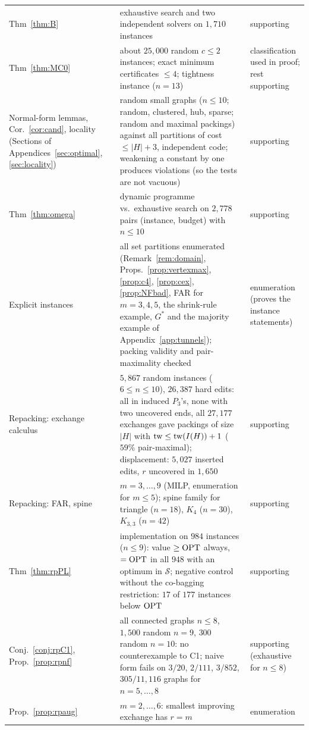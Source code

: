 {\begin{longtable}{@{}>{\raggedright\arraybackslash}p{}>{\raggedright\arraybackslash}p{}>{\raggedright\arraybackslash}p{}@{}}
Thm~\ref{thm:B} & exhaustive search and two independent solvers on $1{,}710$ instances & supporting\\
Thm~\ref{thm:MC0} & about $25{,}000$ random $c\le2$ instances; exact minimum certificates $\le4$; tightness instance ($n=13$) & classification used in proof; rest supporting\\
Normal-form lemmas, Cor.~\ref{cor:cand}, locality (Sections of Appendices~\ref{sec:optimal}, \ref{sec:locality}) & random small graphs ($n\le10$; random, clustered, hub, sparse; random and maximal packings) against all partitions of cost $\le|H|+3$, independent code; weakening a constant by one produces violations (so the tests are not vacuous) & supporting\\
Thm~\ref{thm:omega} & dynamic programme vs.\ exhaustive search on $2{,}778$ pairs (instance, budget) with $n\le10$ & supporting\\
Explicit instances & all set partitions enumerated (Remark~\ref{rem:domain}, Props.~\ref{prop:vertexmax}, \ref{prop:c4}, \ref{prop:cex}, \ref{prop:NFbad}, FAR for $m=3,4,5$, the shrink-rule example, $G^*$ and the majority example of Appendix~\ref{app:tunnels}); packing validity and pair-maximality checked & enumeration (proves the instance statements)\\
Repacking: exchange calculus & $5{,}867$ random instances ($6\le n\le10$), $26{,}387$ hard edits: all in induced $P_3$'s, none with two uncovered ends, all $27{,}177$ exchanges gave packings of size $|H|$ with $\mathrm{tw}\le\mathrm{tw}(I(H))+1$ ($59\%$ pair-maximal); displacement: $5{,}027$ inserted edits, $r$ uncovered in $1{,}650$ & supporting\\
Repacking: FAR, spine & $m=3,\dots,9$ (MILP, enumeration for $m\le5$); spine family for triangle ($n=18$), $K_4$ ($n=30$), $K_{3,3}$ ($n=42$) & supporting\\
Thm~\ref{thm:rpPL} & implementation on $984$ instances ($n\le9$): value $\ge\mathrm{OPT}$ always, $=\mathrm{OPT}$ in all $948$ with an optimum in $\mathcal S$; negative control without the co-bagging restriction: $17$ of $177$ instances below $\mathrm{OPT}$ & supporting\\
Conj.~\ref{conj:rpC1}, Prop.~\ref{prop:rpnf} & all connected graphs $n\le8$, $1{,}500$ random $n=9$, $300$ random $n=10$: no counterexample to C1; naive form fails on $3/20$, $2/111$, $3/852$, $305/11{,}116$ graphs for $n=5,\dots,8$ & supporting (exhaustive for $n\le8$)\\
Prop.~\ref{prop:rpaug} & $m=2,\dots,6$: smallest improving exchange has $r=m$ & enumeration\\
\hline
\end{longtable}}

